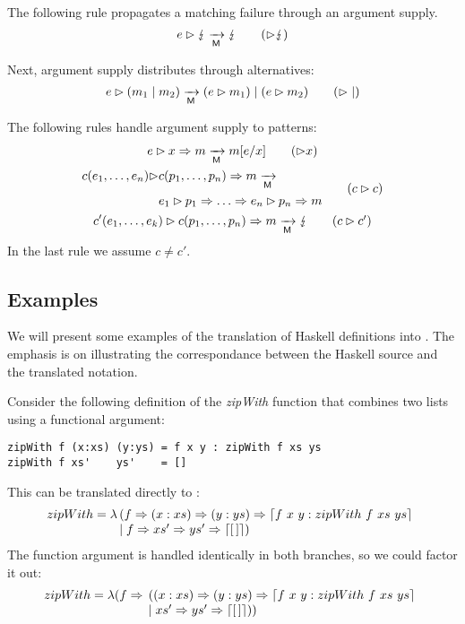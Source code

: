 The following rule propagates a matching failure through an argument supply.
\begin{equation}
  \matcharg{e}{\matchfail} \matred \matchfail \tag{$\amatcharg\matchfail$}
\end{equation}

Next, argument supply distributes through alternatives:
\begin{equation}
  \matcharg{e}{(\matchalt{m_1}{m_2})} \matred
  \matchalt{(\matcharg{e}{m_1})}{(\matcharg{e}{m_2})} \tag{$\amatcharg\amatchalt$}
\end{equation}

The following rules handle argument supply to patterns:
\begin{gather}
  \matcharg{e}{\matchpat{x}{m}} \matred m[e/x] \tag{$\amatcharg x$}\\
  \begin{split}
      \matcharg{\constr{c}{e_1,\ldots,e_n}}{&\matchpat{\constr{c}{p_1,\ldots,p_n}}{m}}
      \matred \\
      &e_1 \amatcharg p_1 \amatchpat \ldots \amatchpat e_n \amatcharg p_n \amatchpat m
    \end{split} \tag{$c\amatcharg c$}
  \\
  \matcharg{\constr{c'}{e_1,\ldots,e_k}}{\matchpat{\constr{c}{p_1,\ldots,p_n}}{m}}
  \matred
  \matchfail \tag{$c\amatcharg c'$} 
\end{gather}
In the last rule we assume $c\neq c'$.


\subsection{Examples}\label{sec:examples}
%
We will present some examples of the translation of Haskell
definitions into \lambdaPMC.  The emphasis is on illustrating the
correspondance between the Haskell source and the translated notation.

Consider the following definition of the \emph{zipWith} function that
combines two lists using a functional argument:
%
\begin{verbatim}
zipWith f (x:xs) (y:ys) = f x y : zipWith f xs ys
zipWith f xs'    ys'    = []
\end{verbatim}
%
This can be translated directly to \lambdaPMC:
%
\[
  zipWith = \lambda 
  \!\!\begin{array}[t]{l}
    (f \Rightarrow (x:xs) \Rightarrow (y:ys) \Rightarrow \left\lceil f~x~y : zipWith~ f~ xs~ ys\right\rceil  \\
    \mid f \Rightarrow xs' \Rightarrow ys' \Rightarrow \left\lceil [\,]\right\rceil)
  \end{array}
\]
%
The function argument is handled identically in both branches, so we
could factor it out:
 \[
   zipWith = \lambda (f \Rightarrow 
   \!\!\begin{array}[t]{l}
     ((x:xs) \Rightarrow (y:ys) \Rightarrow \left\lceil f~ x~ y : zipWith~f~xs~ys\right\rceil  \\
     \mid  xs' \Rightarrow ys' \Rightarrow \left\lceil [\,]\right\rceil))
   \end{array}
 \]

